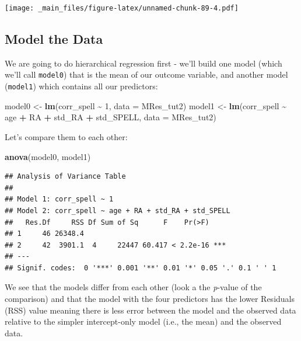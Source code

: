 \documentclass[
]{book}
\newenvironment{Shaded}{\begin{snugshade}}{\end{snugshade}}
\newcommand{\AttributeTok}[1]{\textcolor[rgb]{0.13,0.29,0.53}{#1}}
\newcommand{\DecValTok}[1]{\textcolor[rgb]{0.00,0.00,0.81}{#1}}
\newcommand{\FunctionTok}[1]{\textcolor[rgb]{0.13,0.29,0.53}{\textbf{#1}}}
\newcommand{\NormalTok}[1]{#1}
\newcommand{\OtherTok}[1]{\textcolor[rgb]{0.56,0.35,0.01}{#1}}
\newcommand{\SpecialCharTok}[1]{\textcolor[rgb]{0.81,0.36,0.00}{\textbf{#1}}}
\begin{document}
\texttt{[image: \_main\_files/figure-latex/unnamed-chunk-89-4.pdf]}

\hypertarget{model-the-data-1}{%
\subsection{Model the Data}\label{model-the-data-1}}

We are going to do hierarchical regression first - we'll build one model (which we'll call \texttt{model0}) that is the mean of our outcome variable, and another model (\texttt{model1}) which contains all our predictors:

\begin{Shaded}
\begin{Highlighting}[]
\NormalTok{model0 }\OtherTok{\textless{}{-}} \FunctionTok{lm}\NormalTok{(corr\_spell }\SpecialCharTok{\textasciitilde{}} \DecValTok{1}\NormalTok{, }\AttributeTok{data =}\NormalTok{ MRes\_tut2)}
\NormalTok{model1 }\OtherTok{\textless{}{-}} \FunctionTok{lm}\NormalTok{(corr\_spell }\SpecialCharTok{\textasciitilde{}}\NormalTok{ age }\SpecialCharTok{+}\NormalTok{ RA }\SpecialCharTok{+}\NormalTok{ std\_RA }\SpecialCharTok{+}\NormalTok{ std\_SPELL, }\AttributeTok{data =}\NormalTok{ MRes\_tut2)}
\end{Highlighting}
\end{Shaded}

Let's compare them to each other:

\begin{Shaded}
\begin{Highlighting}[]
\FunctionTok{anova}\NormalTok{(model0, model1)}
\end{Highlighting}
\end{Shaded}

\begin{verbatim}
## Analysis of Variance Table
## 
## Model 1: corr_spell ~ 1
## Model 2: corr_spell ~ age + RA + std_RA + std_SPELL
##   Res.Df     RSS Df Sum of Sq      F    Pr(>F)    
## 1     46 26348.4                                  
## 2     42  3901.1  4     22447 60.417 < 2.2e-16 ***
## ---
## Signif. codes:  0 '***' 0.001 '**' 0.01 '*' 0.05 '.' 0.1 ' ' 1
\end{verbatim}

We see that the models differ from each other (look a the \emph{p}-value of the comparison) and that the model with the four predictors has the lower Residuals (RSS) value meaning there is less error between the model and the observed data relative to the simpler intercept-only model (i.e., the mean) and the observed data.
\end{document}
